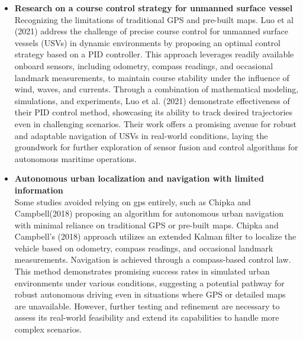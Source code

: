 \begin{itemize}
\item {\bf Research on a course control strategy for unmanned surface vessel} \\
Recognizing the limitations of traditional GPS and pre-built maps. Luo et al (2021) address the challenge of precise 
course control for unmanned surface vessels (USVs) in dynamic environments by proposing an optimal control strategy 
based on a PID controller. This approach leverages readily available onboard sensors, including odometry, compass 
readings, and occasional landmark measurements, to maintain course stability under the influence of wind, waves, and 
currents. Through a combination of mathematical modeling, simulations, and experiments, Luo et al. (2021) demonstrate 
effectiveness of their PID control method, showcasing its ability to track desired trajectories even in challenging 
scenarios. Their work offers a promising avenue for robust and adaptable navigation of USVs in real-world conditions, 
laying the groundwork for further exploration of sensor fusion and control algorithms for autonomous maritime operations.

\item {\bf Autonomous urban localization and navigation with limited information} \\
Some studies avoided relying on gps entirely, such as Chipka and Campbell(2018) proposing an algorithm for autonomous 
urban navigation with minimal reliance on traditional GPS or pre-built maps. Chipka and Campbell’s (2018) approach 
utilizes an extended Kalman filter to localize the vehicle based on odometry, compass readings, and occasional landmark 
measurements. Navigation is achieved through a compass-based control law. This method demonstrates promising success 
rates in simulated urban environments under various conditions, suggesting a potential pathway for robust autonomous 
driving even in situations where GPS or detailed maps are unavailable. However, further testing and refinement are 
necessary to assess its real-world feasibility and extend its capabilities to handle more complex scenarios.


\end{itemize}
